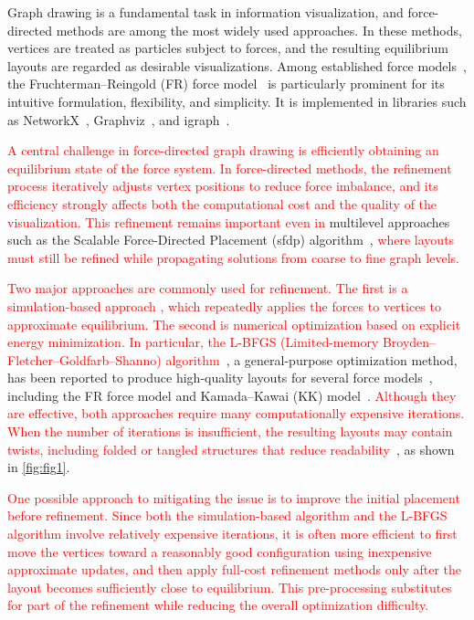 \documentclass[11pt]{article}
\newcommand{\red}[1]{\textcolor{red}{#1}}
\begin{document}
Graph drawing is a fundamental task in information visualization, and force-directed methods are among the most widely used approaches.
In these methods, vertices are treated as particles subject to forces, and the resulting equilibrium layouts are regarded as desirable visualizations.
Among established force models~\citep{eades1984heuristic,kamadaAlgorithmDrawingGeneral1989}, the Fruchterman--Reingold (FR) force model~\citep{fruchtermanGraphDrawingForcedirected1991} is particularly prominent for its intuitive formulation, flexibility, and simplicity.
It is implemented in libraries such as NetworkX~\citep{hagbergExploringNetworkStructure2008}, Graphviz~\citep{ellsonGraphvizOpenSource2002}, and igraph~\citep{csardiIgraphSoftwarePackage2006}.

\red{A central challenge in force-directed graph drawing is efficiently obtaining an equilibrium state of the force system.
  In force-directed methods, the refinement process iteratively adjusts vertex positions to reduce force imbalance, and its efficiency strongly affects both the computational cost and the quality of the visualization.
  This refinement remains important even in} multilevel approaches such as the Scalable Force-Directed Placement (\textsf{sfdp}) algorithm~\citep{Hu2006EfficientHF,ellsonGraphvizOpenSource2002}, \red{where layouts must still be refined while propagating solutions from coarse to fine graph levels.}

\red{Two major approaches are commonly used for refinement.
  The first is a simulation-based approach \citep{fruchtermanGraphDrawingForcedirected1991}, which repeatedly applies the forces to vertices to approximate equilibrium.
  The second is numerical optimization based on explicit energy minimization.
  In particular, the L-BFGS (Limited-memory Broyden--Fletcher--Goldfarb--Shanno) algorithm~\citep{liuLimitedMemoryBFGS1989a}}, a general-purpose optimization method, has been reported to produce high-quality layouts for several force models~\citep{6183577}, including the FR force model and Kamada--Kawai (KK) model~\citep{kamadaAlgorithmDrawingGeneral1989}.
\red{Although they are effective, both approaches require many computationally expensive iterations.
  When the number of iterations is insufficient, the resulting layouts may contain twists, including folded or tangled structures that reduce readability}~\cite{veldhuizenDynamicMultilevelGraph2007,cheongSnapshotVisualizationComplex2018}, as shown in \cref{fig:fig1}.

\red{One possible approach to mitigating the issue is to improve the initial placement before refinement.
  Since both the simulation-based algorithm and the L-BFGS algorithm involve relatively expensive iterations, it is often more efficient to first move the vertices toward a reasonably good configuration using inexpensive approximate updates, and then apply full-cost refinement methods only after the layout becomes sufficiently close to equilibrium.
  This pre-processing substitutes for part of the refinement while reducing the overall optimization difficulty.}
\end{document}
